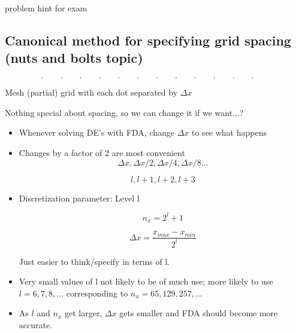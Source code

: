 problem hint for exam

\subsection{Canonical method for specifying grid spacing (nuts and bolts topic)}

\[ . \qquad . \qquad . \qquad . \qquad . \qquad . \qquad . \qquad . \qquad . \qquad . \qquad . \qquad . \qquad \]

Mesh (partial) grid with each dot separated by $\Delta x$

\vspace{10 px}

Nothing special about spacing, so we can change it if we want...?

\begin{itemize}
    \item Whenever solving DE's with FDA, change $\Delta x$ to see what happens 
    \item Changes by a factor of 2 are most convenient
    \[ \Delta x, \Delta x/2, \Delta x/4, \Delta x/8 ...\]

    \[ l , l+1, l+2, l+3\]

    \item Discretization parameter: Level l

    \[ n_x = 2^l + 1\]

    \[ \Delta x = \frac{x_{max}-x_{min}}{2^l}\]

    Just easier to think/specify in terms of l.

    \item Very small values of l not likely to be of much use; more likely to use $ l = 6,7,8,...$ corresponding to $n_x = 65,129,257,...$

    \item As $l$ and $n_x$ get larger, $\Delta x$ gets smaller and FDA should become more accurate.
\end{itemize}

